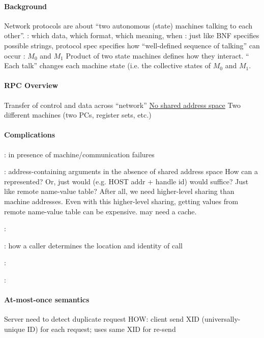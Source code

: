 \documentclass{memo}
\begin{document}
\small
{}

\paragraph{Background}
\bit
\w Network protocols are about ``two autonomous 
       (state) machines talking to each other''.
  \bit
  \w {}: which data, which format, which meaning, when
  \w {}: just like BNF specifies possible strings, 
     protocol spec specifies how ``well-defined sequence of talking'' can
     occur  
  \eit
\w {}: $M_0$ and $M_1$
   \bit
   \w Product of two state machines defines how they interact.
   \w `` Each talk'' changes each machine state (i.e. the collective 
      states of $M_0$ and $M_1$. 
   \eit
\eit

\paragraph{RPC Overview}
\bit
\w Transfer of control and data across ``network''
  \bit
  \w \underline{No shared address space}
  \w Two different machines (two PCs, register sets, etc.)
  \eit
\eit

\paragraph{Complications}
\bit
\w {}: in presence of machine/communication failures

\w {}: {address-containing arguments in the absence of
  shared address space} 
  \bit
  \w How can a  represented? Or, just would  (e.g. HOST addr + handle id) would suffice? Just like remote
     name-value table? After all, we need higher-level sharing than machine
     addresses. 
  \w Even with this higher-level sharing, getting values from remote
  name-value table can be expensive.
    \bit
    \w may need a cache.
    \eit
  \eit

\w {}:
 
\w {}:  how a caller determines the location and identity of call

\w {}:

\w {}:
\eit

\paragraph{At-most-once semantics}
\bit
\w Server need to detect duplicate request
   \bit
   \w HOW: client send XID (universally-unique ID) for each request; uses same
       XID for re-send 
   
\end{document}
